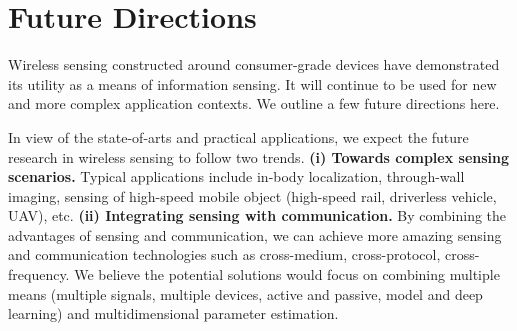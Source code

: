 \section{Future Directions}

Wireless sensing constructed around consumer-grade devices have demonstrated its utility as a means of information sensing. It will
continue to be used for new and more complex application contexts. We outline a few future directions here. 

In view of the state-of-arts and practical applications, we expect the future research in wireless sensing to follow two trends.
\textbf{(i) Towards complex sensing scenarios.} Typical applications include in-body localization, through-wall imaging, sensing of
high-speed mobile object (high-speed rail, driverless vehicle, UAV), etc. \textbf{(ii) Integrating sensing with communication.} By
combining the advantages of sensing and communication, we can achieve more amazing sensing and communication technologies such as
cross-medium, cross-protocol, cross-frequency. We believe the potential solutions would focus on combining multiple means (multiple
signals, multiple devices, active and passive, model and deep learning) and multidimensional parameter estimation.
